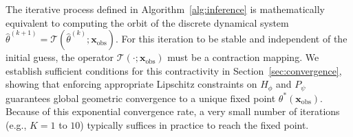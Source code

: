 The iterative process defined in Algorithm~\ref{alg:inference} is mathematically equivalent to computing the orbit of the discrete dynamical system $\hat{\theta}^{(k+1)} = \mathcal{T}(\hat{\theta}^{(k)}; \mathbf{x}_{\mathrm{obs}})$. For this iteration to be stable and independent of the initial guess, the operator $\mathcal{T}(\cdot; \mathbf{x}_{\mathrm{obs}})$ must be a contraction mapping. We establish sufficient conditions for this contractivity in Section~\ref{sec:convergence}, showing that enforcing appropriate Lipschitz constraints on $H_\phi$ and $P_\psi$ guarantees global geometric convergence to a unique fixed point $\theta^*(\mathbf{x}_{\mathrm{obs}})$. Because of this exponential convergence rate, a very small number of iterations (e.g., $K = 1$ to $10$) typically suffices in practice to reach the fixed point.
